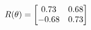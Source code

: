 \documentclass[preview]{standalone}
\begin{document}
\begin{align*}
\special{dvisvgm:raw <g id='unique000'>}R(\theta) = \begin{bmatrix}0.73 & 0.68\\-0.68 & 0.73\end{bmatrix}\special{dvisvgm:raw </g>}
\end{align*}
\end{document}
